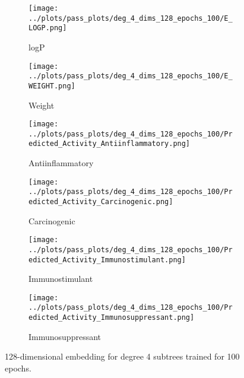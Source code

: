 \begin{figure*}
\centering

\begin{subfigure}{0.45\textwidth}
    \texttt{[image: ../plots/pass\_plots/deg\_4\_dims\_128\_epochs\_100/E\_LOGP.png]}
    \caption{logP}
\end{subfigure}
\begin{subfigure}{0.45\textwidth}
    \texttt{[image: ../plots/pass\_plots/deg\_4\_dims\_128\_epochs\_100/E\_WEIGHT.png]}
    \caption{Weight}
\end{subfigure}
\begin{subfigure}{0.45\textwidth}
    \texttt{[image: ../plots/pass\_plots/deg\_4\_dims\_128\_epochs\_100/Predicted\_Activity\_Antiinflammatory.png]}
    \caption{Antiinflammatory}
\end{subfigure}
\begin{subfigure}{0.45\textwidth}
    \texttt{[image: ../plots/pass\_plots/deg\_4\_dims\_128\_epochs\_100/Predicted\_Activity\_Carcinogenic.png]}
    \caption{Carcinogenic}
\end{subfigure}
\begin{subfigure}{0.45\textwidth}
    \texttt{[image: ../plots/pass\_plots/deg\_4\_dims\_128\_epochs\_100/Predicted\_Activity\_Immunostimulant.png]}
    \caption{Immunostimulant}
\end{subfigure}
\begin{subfigure}{0.45\textwidth}
    \texttt{[image: ../plots/pass\_plots/deg\_4\_dims\_128\_epochs\_100/Predicted\_Activity\_Immunosuppressant.png]}
    \caption{Immunosuppressant}
\end{subfigure}
\caption{128-dimensional embedding for degree 4 subtrees trained for 100 epochs.}
\label{fig:deg_4_dims_128_epochs_100}
\end{figure*}
